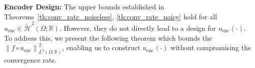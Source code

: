 \documentclass{article}
\newtheorem{corollary}{Corollary}
\def\encs{u_\textrm{enc}}
\def\nprcc{\texttt{LeTCC}}
\newcommand{\norm}[1]{\left\lVert#1\right\rVert}
\newcommand{\lp}[1]{{L}^{#1}\left(\Omega; \mathbb{R}\right)}
\newcommand{\hiltilde}[1]{\widetilde{\mathcal{H}}^{#1}\left(\Omega;\mathbb{R}\right)}
\begin{document}

{\bf Encoder Design:} The upper bounds established in Theorems~\ref{th:conv_rate_noiseless}, 
\ref{th:conv_rate_noisy} hold for all $\encs \in \hiltilde{2}$. However, they do not directly lead to a design for $\encs(\cdot)$. To address this, we present the following theorem which bounds the $\norm{f\circ\encs}^2_{\lp{2}}$, enabling us to construct $\encs(\cdot)$ without compromising the convergence rate.
\end{document}
